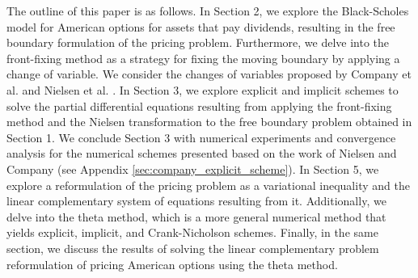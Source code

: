 The outline of this paper is as follows. In Section 2, we explore the Black-Scholes model for American options for assets that pay dividends, resulting in the free boundary formulation of the pricing problem. Furthermore, we delve into the front-fixing method as a strategy for fixing the moving boundary by applying a change of variable. We consider the changes of variables proposed by Company et al. \cite{company_egorova_jodar_2014} and Nielsen et al. \cite{nielsen_2001}. In Section 3, we explore explicit and implicit schemes to solve the partial differential equations resulting from applying the front-fixing method and the Nielsen transformation to the free boundary problem obtained in Section 1. We conclude Section 3 with numerical experiments and convergence analysis for the numerical schemes presented based on the work of Nielsen and Company (see Appendix \ref{sec:company_explicit_scheme}). In Section 5, we explore a reformulation of the pricing problem as a variational inequality and the linear complementary system of equations resulting from it. Additionally, we delve into the theta method, which is a more general numerical method that yields explicit, implicit, and Crank-Nicholson schemes. Finally, in the same section, we discuss the results of solving the linear complementary problem reformulation of pricing American options using the theta method.
